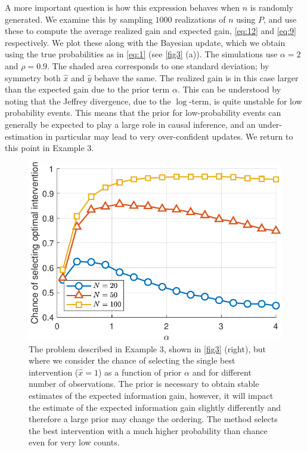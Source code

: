 \documentclass[letterpaper]{article} %
\begin{document}
A more important question is how this expression behaves when $n$ is randomly generated. We examine this by sampling $1000$ realizations of $n$ using $P$, and use these to compute the average realized gain and expected gain, \cref{eq:12} and \cref{eq:9} respectively.  We plot these along with the Bayesian update, which we obtain using the true probabilities as in \cref{eq:1} (see \cref{fig3} (a)). The simulations use $\alpha = 2$ and $\rho = 0.9$. The shaded area corresponds to one standard deviation; by symmetry both $\hat x$ and $\hat y$ behave the same. The realized gain is in this case larger than the expected gain due to the prior term $\alpha$. This can be understood by noting that the Jeffrey divergence, due to the $\log$-term, is quite unstable for low probability events. This means that the prior for low-probability events can generally be expected to play a large role in causal inference, and an under-estimation in particular may lead to very over-confident updates. We return to this point in Example 3. 

\begin{figure}[t!]
	\centering
	\includegraphics[width=.8\linewidth]{alpha-crop}
	\caption{The problem described in Example 3, shown in \cref{fig3} (right), but where we consider the chance of selecting the single best intervention ($\hat x=1$) as a function of prior $\alpha$ and for different number of observations. The prior is necessary to obtain stable estimates of the expected information gain, however, it will impact the estimate of the expected information gain slightly differently and therefore a large prior may change the ordering. The method selects the best intervention with a much higher probability than chance even for very low counts. }\label{fig4}
\end{figure}
\end{document}
